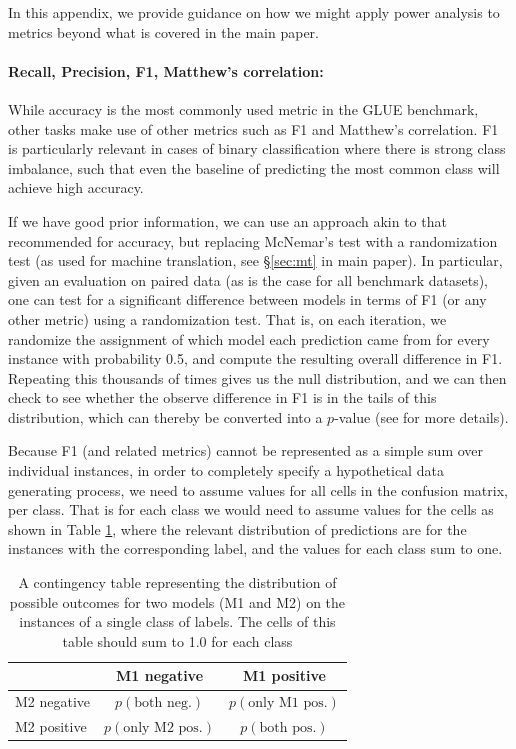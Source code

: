 \documentclass[11pt,a4paper]{article}
\begin{document}
In this appendix, we provide guidance on how we might apply power analysis to metrics beyond what is covered in the main paper.

\paragraph{Recall, Precision, F1, Matthew's correlation:}

While accuracy is the most commonly used metric in the GLUE benchmark, other tasks make use of other metrics such as F1 and Matthew's correlation. F1 is particularly relevant in cases of binary classification where there is strong class imbalance, such that even the baseline of predicting the most common class will achieve high accuracy. 

If we have good prior information, we can use an approach akin to that recommended for accuracy, but replacing McNemar's test with a randomization test (as used for machine translation, see \S\ref{sec:mt} in main paper). In particular, given an evaluation on paired data (as is the case for all benchmark datasets), one can test for a significant difference between models in terms of F1 (or any other metric) using a randomization test. That is, on each iteration, we randomize the assignment of which model each prediction came from for every instance with probability 0.5, and compute the resulting overall difference in F1. Repeating this thousands of times gives us the null distribution, and we can then check to see whether the observe difference in F1 is in the tails of this distribution, which can thereby be converted into a $p$-value (see \citet{dror.2018} for more details).

Because F1 (and related metrics) cannot be represented as a simple sum over individual instances, in order to completely specify a hypothetical data generating process, we need to assume values for all cells in the confusion matrix, per class. That is for each class we would need to assume values for the cells as shown in Table \ref{tab:contingency_f1}, where the relevant distribution of predictions are for the instances with the corresponding label, and the values for each class sum to one.

\begin{table}[!ht]
\begin{center}
\small
\begin{tabular}{l|cc}
        & M1 negative & M1 positive\\\hline
M2 negative & $p(\textrm{both neg.})$ & $p(\textrm{only M1 pos.})$\\ 
M2 positive & $p(\textrm{only M2 pos.})$ & $p(\textrm{both pos.})$\\ 
\end{tabular}
\end{center}
    \caption{A contingency table representing the distribution of possible outcomes for two models (M1 and M2) on the instances of a single class of labels. The cells of this table should sum to 1.0 for each class}
    \label{tab:contingency_f1}
\end{table}
\end{document}
